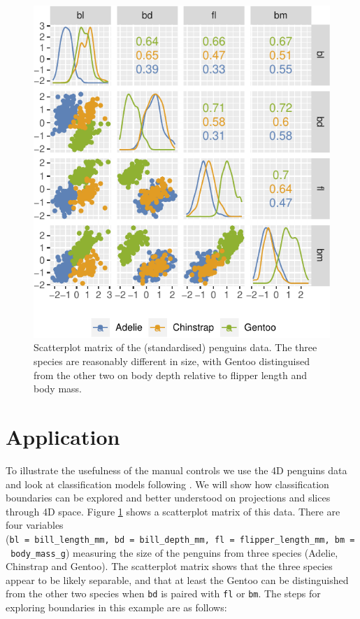 \documentclass[]{interact}
\theoremstyle{plain}%
\theoremstyle{definition}
\theoremstyle{remark}
\begin{document}
\begin{figure}

{\centering \includegraphics[width=0.8\linewidth]{paper_files/figure-latex/penguins-scatmat-1} 

}

\caption{Scatterplot matrix of the (standardised) penguins data. The three species are reasonably different in size, with Gentoo distinguised from the other two on body depth relative to flipper length and body mass.}\label{fig:penguins-scatmat}
\end{figure}

\hypertarget{sec:examples}{%
\section{Application}\label{sec:examples}}

To illustrate the usefulness of the manual controls we use the 4D
penguins data \citep{penguins} and look at classification models
following \citet{sam11271}. We will show how classification boundaries
can be explored and better understood on projections and slices through
4D space. Figure \ref{fig:penguins-scatmat} shows a scatterplot matrix
of this data. There are four variables
(\texttt{bl\ =\ bill\_length\_mm,\ bd\ =\ bill\_depth\_mm,\ fl\ =\ flipper\_length\_mm,\ bm\ =\ body\_mass\_g})
measuring the size of the penguins from three species (Adelie, Chinstrap
and Gentoo). The scatterplot matrix shows that the three species appear
to be likely separable, and that at least the Gentoo can be
distinguished from the other two species when \texttt{bd} is paired with
\texttt{fl} or \texttt{bm}. The steps for exploring boundaries in this
example are as follows:
\end{document}

